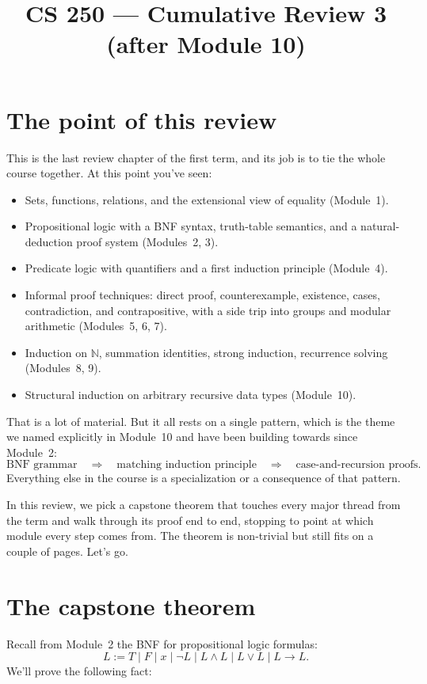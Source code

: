 \documentclass[11pt]{article}
\title{CS 250 --- Cumulative Review 3 (after Module 10)}
\author{}
\date{}
\begin{document}
\maketitle

\section*{The point of this review}

This is the last review chapter of the first term, and its job is to tie the whole course together. At this point you've seen:
\begin{itemize}
  \item Sets, functions, relations, and the extensional view of equality (Module~1).
  \item Propositional logic with a BNF syntax, truth-table semantics, and a natural-deduction proof system (Modules~2, 3).
  \item Predicate logic with quantifiers and a first induction principle (Module~4).
  \item Informal proof techniques: direct proof, counterexample,
  existence, cases, contradiction, and contrapositive, with a side trip
  into groups and modular arithmetic (Modules~5, 6, 7).
  \item Induction on $\mathbb{N}$, summation identities, strong induction, recurrence solving (Modules~8, 9).
  \item Structural induction on arbitrary recursive data types (Module~10).
\end{itemize}
That is a lot of material. But it all rests on a single pattern, which
is the theme we named explicitly in Module~10 and have been building
towards since Module~2:
\[
  \text{BNF grammar}
  \quad\Longrightarrow\quad
  \text{matching induction principle}
  \quad\Longrightarrow\quad
  \text{case-and-recursion proofs}.
\]
Everything else in the course is a specialization or a consequence of
that pattern.

In this review, we pick a capstone theorem that touches every major thread from the term and walk through its proof end to end, stopping to point at which module every step comes from. The theorem is non-trivial but still fits on a couple of pages. Let's go.

\section*{The capstone theorem}

Recall from Module~2 the BNF for propositional logic formulas:
\[
  L := T \mid F \mid x \mid \lnot L \mid L \wedge L \mid L \vee L \mid L \to L.
\]
We'll prove the following fact:
\end{document}
